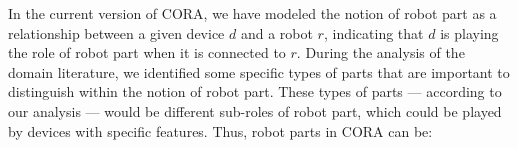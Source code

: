 \documentclass[preprint,12pt]{elsarticle}
\begin{document}



In the current version of CORA, we have modeled the notion of robot part as a relationship between a given device $d$ and a robot $r$, indicating that $d$ is playing the role of robot part when it is connected to $r$. During the analysis of the domain literature, we identified some specific types of parts that are important to distinguish within the notion of robot part. These types of parts --- according to our analysis --- would be different sub-roles of robot part, which could be played by devices with specific features. Thus, robot parts in CORA can be:
\end{document}

